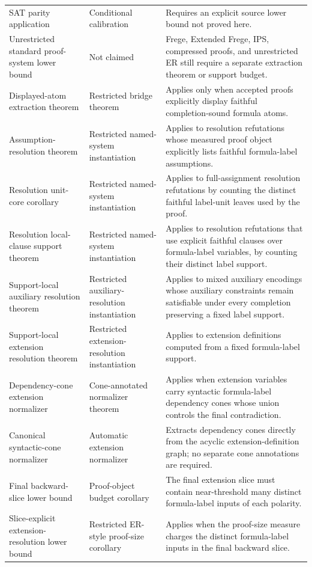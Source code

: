 \documentclass[11pt]{article}
\theoremstyle{definition}
\begin{document}
{\begin{longtable}{@{}p{}p{}p{}@{}}
SAT parity application & Conditional calibration & Requires an explicit source lower bound not proved here. \\
Unrestricted standard proof-system lower bound & Not claimed & Frege, Extended Frege, IPS, compressed proofs, and unrestricted ER still require a separate extraction theorem or support budget. \\
Displayed-atom extraction theorem & Restricted bridge theorem & Applies only when accepted proofs explicitly display faithful completion-sound formula atoms. \\
Assumption-resolution theorem & Restricted named-system instantiation & Applies to resolution refutations whose measured proof object explicitly lists faithful formula-label assumptions. \\
Resolution unit-core corollary & Restricted named-system instantiation & Applies to full-assignment resolution refutations by counting the distinct faithful label-unit leaves used by the proof. \\
Resolution local-clause support theorem & Restricted named-system instantiation & Applies to resolution refutations that use explicit faithful clauses over formula-label variables, by counting their distinct label support. \\
Support-local auxiliary resolution theorem & Restricted auxiliary-resolution instantiation & Applies to mixed auxiliary encodings whose auxiliary constraints remain satisfiable under every completion preserving a fixed label support. \\
Support-local extension resolution theorem & Restricted extension-resolution instantiation & Applies to extension definitions computed from a fixed formula-label support. \\
Dependency-cone extension normalizer & Cone-annotated normalizer theorem & Applies when extension variables carry syntactic formula-label dependency cones whose union controls the final contradiction. \\
Canonical syntactic-cone normalizer & Automatic extension normalizer & Extracts dependency cones directly from the acyclic extension-definition graph; no separate cone annotations are required. \\
Final backward-slice lower bound & Proof-object budget corollary & The final extension slice must contain near-threshold many distinct formula-label inputs of each polarity. \\
Slice-explicit extension-resolution lower bound & Restricted ER-style proof-size corollary & Applies when the proof-size measure charges the distinct formula-label inputs in the final backward slice. \\

\end{longtable}}
\end{document}
